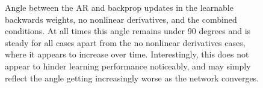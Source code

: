 \begin{figure}
\centering
{}\hfil
{}\hfil 
{} 
\caption{Angle between the AR and backprop updates in the learnable backwards weights, no nonlinear derivatives, and the combined conditions. At all times this angle remains under 90 degrees and is steady for all cases apart from the no nonlinear derivatives cases, where it appears to increase over time. Interestingly, this does not appear to hinder learning performance noticeably, and may simply reflect the angle getting increasingly worse as the network converges.}
\label{AR_grad_angle_figure}
\end{figure}

